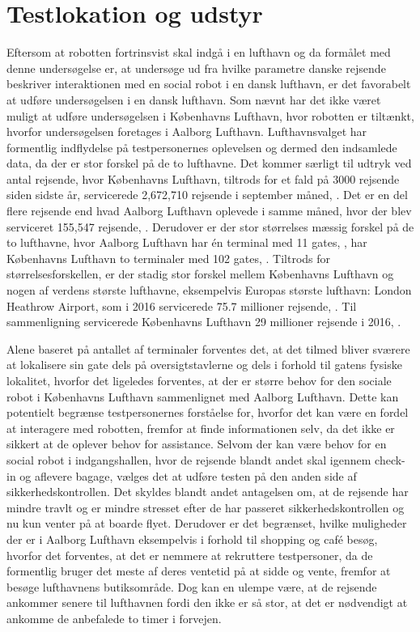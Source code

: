 \section{Testlokation og udstyr}
\label{ParametreTestlokationOgUdstyr}
%
Eftersom at robotten fortrinsvist skal indgå i en lufthavn og da formålet med denne undersøgelse er, at undersøge ud fra hvilke parametre danske rejsende beskriver interaktionen med en social robot i en dansk lufthavn, er det favorabelt at udføre undersøgelsen i en dansk lufthavn. Som nævnt har det ikke været muligt at udføre undersøgelsen i Københavns Lufthavn, hvor robotten er tiltænkt, hvorfor undersøgelsen foretages i Aalborg Lufthavn. Lufthavnsvalget har formentlig indflydelse på testpersonernes oplevelsen og dermed den indsamlede data, da der er stor forskel på de to lufthavne. Det kommer særligt til udtryk ved antal rejsende, hvor Københavns Lufthavn, tiltrods for et fald på 3000 rejsende siden sidste år, servicerede 2,672,710 rejsende i september måned, \parencite{WEB:CPHStatistisk}. Det er en del flere rejsende end hvad Aalborg Lufthavn oplevede i samme måned, hvor der blev serviceret 155,547 rejsende, \parencite{WEB:AALStatistik}. Derudover er der stor størrelses mæssig forskel på de to lufthavne, hvor Aalborg Lufthavn har én terminal med 11 gates, \parencite{WEB:AALTerminalOversigt}, har Københavns Lufthavn to terminaler med 102 gates, \parencite{WEB:CPHTerminalOversigt}. Tiltrods for  størrelsesforskellen, er der stadig stor forskel mellem Københavns Lufthavn og nogen af verdens største lufthavne, eksempelvis Europas største lufthavn: London Heathrow Airport, som i 2016 servicerede 75.7 millioner rejsende, \parencite{WEB:HeathrowStatistisk}. Til sammenligning servicerede Københavns Lufthavn 29 millioner rejsende i 2016, \parencite{WEB:CPHStatistiskYear}.

Alene baseret på antallet af terminaler forventes det, at det tilmed bliver sværere at lokalisere sin gate dels på oversigtstavlerne og dels i forhold til gatens fysiske lokalitet, hvorfor det ligeledes forventes, at der er større behov for den sociale robot i Københavns Lufthavn sammenlignet med Aalborg Lufthavn. Dette kan potentielt begrænse testpersonernes forståelse for, hvorfor det kan være en fordel at interagere med robotten, fremfor at finde informationen selv, da det ikke er sikkert at de oplever behov for assistance.\blankline
%
Selvom der kan være behov for en social robot i indgangshallen, hvor de rejsende blandt andet skal igennem check-in og aflevere bagage, vælges det at udføre testen på den anden side af sikkerhedskontrollen. Det skyldes blandt andet antagelsen om, at de rejsende har mindre travlt og er mindre stresset efter de har passeret sikkerhedskontrollen og nu kun venter på at boarde flyet. Derudover er det begrænset, hvilke muligheder der er i Aalborg Lufthavn eksempelvis i forhold til shopping og café besøg, hvorfor det forventes, at det er nemmere at rekruttere testpersoner, da de formentlig bruger det meste af deres ventetid på at sidde og vente, fremfor at besøge lufthavnens butiksområde. Dog kan en ulempe være, at de rejsende ankommer senere til lufthavnen fordi den ikke er så stor, at det er nødvendigt at ankomme de anbefalede to timer i forvejen.


